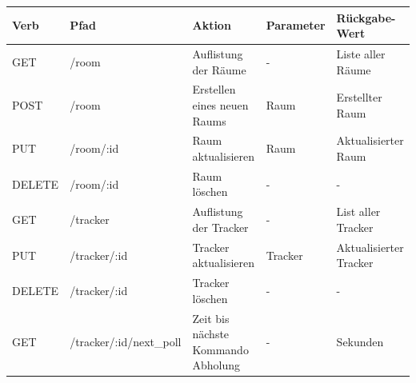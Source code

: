 \begin{small}
\begin{landscape}
	\begin{longtable}{l|l|l|l|l} \label{tab:http-api}
\textbf{Verb} & \textbf{Pfad}                   & \textbf{Aktion}                     & \textbf{Parameter}                                          & \textbf{Rückgabe-Wert}                                                  \\ \hline
\endhead
%
GET           & /room                           & Auflistung der Räume                & -                                                           & Liste aller Räume                                                       \\ \hline
POST          & /room                           & Erstellen eines neuen Raums         & Raum                                                        & Erstellter Raum                                                         \\ \hline
PUT           & /room/:id                       & Raum aktualisieren                  & Raum                                                        & Aktualisierter Raum                                                     \\ \hline
DELETE        & /room/:id                       & Raum löschen                        & -                                                           & -                                                                       \\ \hline
GET           & /tracker                        & Auflistung der Tracker              & -                                                           & List aller Tracker                                                      \\ \hline
PUT           & /tracker/:id                    & Tracker aktualisieren               & Tracker                                                     & Aktualisierter Tracker                                                  \\ \hline
DELETE        & /tracker/:id                    & Tracker löschen                     & -                                                           & -                                                                       \\ \hline
GET           & /tracker/:id/next\_poll          & Zeit bis nächste Kommando Abholung & -                                                & Sekunden                                                                \\ \hline

\end{longtable}
\end{landscape}
\end{small}
